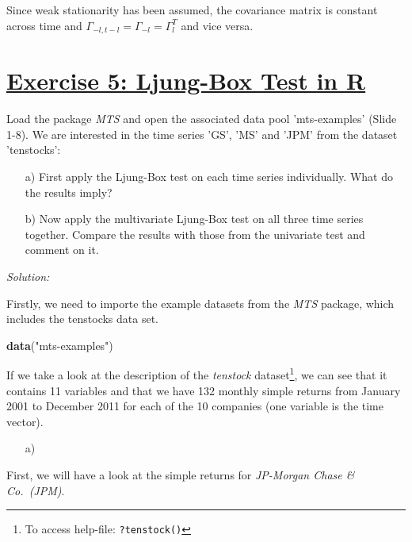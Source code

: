 \documentclass[12pt,a4paper]{article}
\newcommand{\tmpsection}[1]{}
\let\tmpsection=\section
\renewcommand{\section}[1]{\tmpsection{\underline{#1}} }
\newenvironment{Shaded}{\begin{snugshade}}{\end{snugshade}}
\newcommand{\DataTypeTok}[1]{\textcolor[rgb]{0.13,0.29,0.53}{#1}}
\newcommand{\DecValTok}[1]{\textcolor[rgb]{0.00,0.00,0.81}{#1}}
\newcommand{\KeywordTok}[1]{\textcolor[rgb]{0.13,0.29,0.53}{\textbf{#1}}}
\newcommand{\NormalTok}[1]{#1}
\newcommand{\OperatorTok}[1]{\textcolor[rgb]{0.81,0.36,0.00}{\textbf{#1}}}
\newcommand{\StringTok}[1]{\textcolor[rgb]{0.31,0.60,0.02}{#1}}
\let\rmarkdownfootnote\footnote%
\def\footnote{\protect\rmarkdownfootnote}
\begin{document}
Since weak stationarity has been assumed, the covariance matrix is
constant across time and
\(\Gamma_{-l, t- l} = \Gamma_{-l} = \Gamma_{l}^{T}\) and vice versa.

\hypertarget{exercise-5-ljung-box-test-in-r}{%
\section{Exercise 5: Ljung-Box Test in
R}\label{exercise-5-ljung-box-test-in-r}}

Load the package \emph{MTS} and open the associated data pool
'mts-examples' (Slide 1-8). We are interested in the time series 'GS',
'MS' and 'JPM' from the dataset 'tenstocks':

\begin{itemize}
  \item[a)] First apply the Ljung-Box test on each time series individually. What do the results imply?
  \item[b)] Now apply the multivariate Ljung-Box test on all three time series together. Compare the results with those from the univariate test and comment on it.
\end {itemize}

\emph{Solution:}

Firstly, we need to importe the example datasets from the \emph{MTS}
package, which includes the tenstocks data set.

\begin{Shaded}
\begin{Highlighting}[]
\KeywordTok{data}\NormalTok{(}\StringTok{"mts-examples"}\NormalTok{)}
\end{Highlighting}
\end{Shaded}

If we take a look at the description of the \emph{tenstock}
dataset\footnote{To access help-file: \texttt{?tenstock()}}, we can see
that it contains 11 variables and that we have 132 monthly simple
returns from January 2001 to December 2011 for each of the 10 companies
(one variable is the time vector).

\begin{itemize}
  \item[a)] $\quad$
\end {itemize}

First, we will have a look at the simple returns for \emph{JP-Morgan
Chase \& Co.~(JPM)}.

\begin{Shaded}
\end{Shaded}
\end{document}
